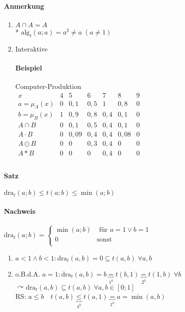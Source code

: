 \documentclass[a4paper]{scrartcl}
\begin{document}
\paragraph{Anmerkung}
\begin{enumerate}
\item $A \cap A = A$ \\*
$\text{alg}_t (a;a) = a^2 \neq a \; (a \neq 1)$
\item Interaktive
\paragraph{Beispiel} Computer-Produktion\\
$\begin{array}{c|c|c|c|c|c|c}
x & 4 & 5 & 6 & 7 & 8 & 9 \\ \hline
a = \mu_A(x)  & 0 & 0,1 &0,5 & 1 & 0,8 & 0 \\
b = \mu_B(x) & 1 & 0,9 & 0,8 & 0,4 & 0,1 & 0 \\ \hline
A \cap B & 0 &0,1 & 0,5 & 0,4 & 0,1 & 0 \\
A \cdot B & 0 & 0,09 & 0,4 & 0,4 & 0,08 & 0 \\
A \odot B & 0 & 0 & 0,3 & 0,4 & 0 & 0 \\
A \ast B & 0 & 0 &0 & 0,4 & 0 &0 \\

\end{array}$
\end{enumerate}

\paragraph{Satz} $\text{dra}_t (a;b) \leq t(a;b) \leq \min (a;b)$
\paragraph{Nachweis} $\text{dra}_t (a;b) = \left\{ \begin{array}{cr} \min (a;b) & \text{ für } a = 1 \vee b= 1\\ 0 & \text{sonst} \\ \end{array} \right.$
\begin{enumerate}
\item $a < 1 \wedge b < 1: \text{dra}_t (a,b) = 0 \subseteq t(a,b) \; \forall a,b $
\item o.B.d.A. $a=1 : \text{dra}_t (a,b) = b \underbrace{=}_{1^0} t(b,1) \underbrace{=}_{2^0} t(1,b) \; \forall b $\\
$\curvearrowright \text{dra}_t (a,b) \subseteq t(a,b) \; \forall a,b \in [0;1]$\\
RS: $a\leq b \quad t(a,b) \underbrace{\leq}_{4^0} t(a,1) \underbrace{=}_{1^0} a = \min (a,b)$
\end{enumerate}
\end{document}
